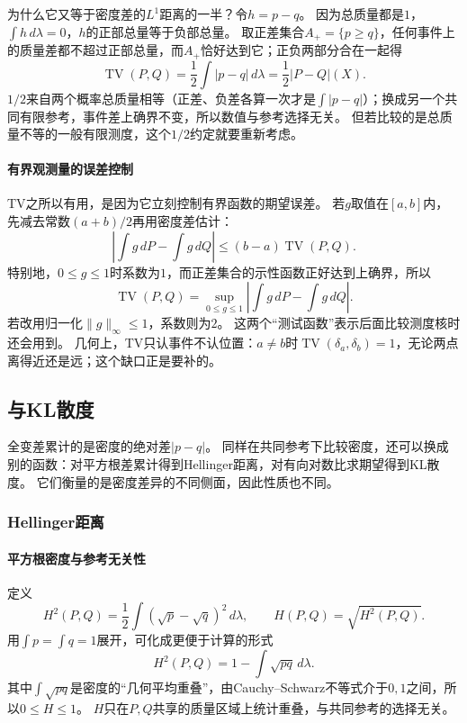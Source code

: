 为什么它又等于密度差的$L^1$距离的一半？令$h=p-q$。
因为总质量都是$1$，$\int h\,d\lambda=0$，$h$的正部总量等于负部总量。
取正差集合$A_+=\{p\geq q\}$，任何事件上的质量差都不超过正部总量，而$A_+$恰好达到它；正负两部分合在一起得
\[
 \operatorname{TV}(P,Q)
 =\frac12\int|p-q|\,d\lambda
 =\frac12|P-Q|(X).
\]
$1/2$来自两个概率总质量相等（正差、负差各算一次才是$\int|p-q|$）；换成另一个共同有限参考，事件差上确界不变，所以数值与参考选择无关。
但若比较的是总质量不等的一般有限测度，这个$1/2$约定就要重新考虑。

\paragraph{有界观测量的误差控制}

TV之所以有用，是因为它立刻控制有界函数的期望误差。
若$g$取值在$[a,b]$内，先减去常数$(a+b)/2$再用密度差估计：
\[
 \left|\int g\,dP-\int g\,dQ\right|
 \leq(b-a)\operatorname{TV}(P,Q).
\]
特别地，$0\leq g\leq1$时系数为$1$，而正差集合的示性函数正好达到上确界，所以
\[
 \operatorname{TV}(P,Q)=\sup_{0\leq g\leq1}\left|\int g\,dP-\int g\,dQ\right|.
\]
若改用归一化$\|g\|_\infty\leq1$，系数则为$2$。
这两个“测试函数”表示后面比较测度核时还会用到。
几何上，TV只认事件不认位置：$a\neq b$时$\operatorname{TV}(\delta_a,\delta_b)=1$，无论两点离得近还是远；这个缺口正是要补的。

\subsection{与KL散度}

全变差累计的是密度的绝对差$|p-q|$。
同样在共同参考下比较密度，还可以换成别的函数：对平方根差累计得到Hellinger距离，对有向对数比求期望得到KL散度。
它们衡量的是密度差异的不同侧面，因此性质也不同。

\subsubsection{Hellinger距离}

\paragraph{平方根密度与参考无关性}

定义
\[
 H^2(P,Q)=\frac12\int(\sqrt p-\sqrt q)^2\,d\lambda,
\qquad H(P,Q)=\sqrt{H^2(P,Q)}.
\]
用$\int p=\int q=1$展开，可化成更便于计算的形式
\[
 H^2(P,Q)=1-\int\sqrt{pq}\,d\lambda.
\]
其中$\int\sqrt{pq}$是密度的“几何平均重叠”，由Cauchy–Schwarz不等式介于$0,1$之间，所以$0\leq H\leq1$。
$H$只在$P,Q$共享的质量区域上统计重叠，与共同参考的选择无关。

